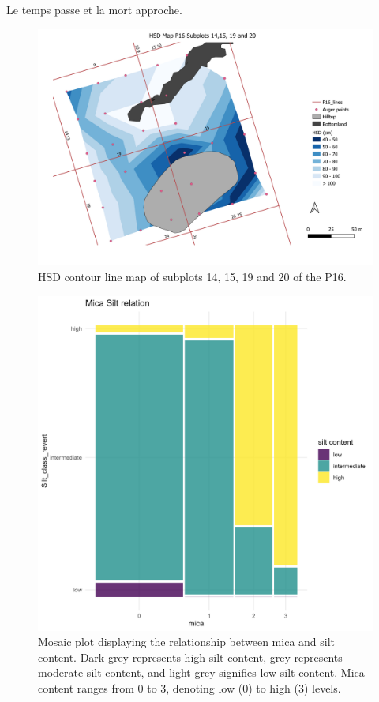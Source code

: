 \documentclass[fleqn,12pt]{latex/stylish_article} %
\begin{document}
Le temps passe et la mort approche.

\break



\scriptsize

\begin{figure}

{\centering \includegraphics[width=0.6\linewidth]{images/HSD_MapwithBFandPL} 

}

\caption{HSD contour line map of subplots 14, 15, 19 and 20 of the P16.}\label{fig:HSDMapwithBFandPL}
\end{figure}

\normalsize



\scriptsize

\begin{figure}

{\centering \includegraphics[width=0.6\linewidth]{images/augerPlot_micaCor} 

}

\caption{Mosaic plot displaying the relationship between mica and silt content. Dark grey represents high silt content, grey represents moderate silt content, and light grey signifies low silt content. Mica content ranges from 0 to 3, denoting low (0) to high (3) levels.}\label{fig:augerPlotmicaCor}
\end{figure}
\end{document}
